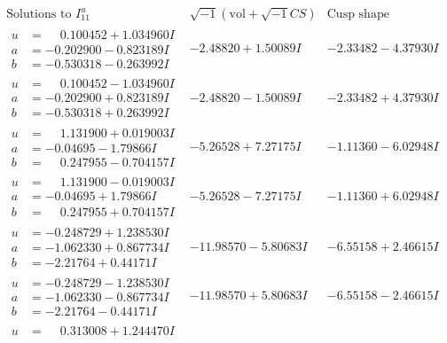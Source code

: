 \documentclass[1p]{elsarticle_modified}
\theoremstyle{definition}
\newcommand{\I}{\sqrt{-1}}
\begin{document}
$$\begin{array}{c|c|c}  
\text{Solutions to }I^u_{11}& \I (\text{vol} + \sqrt{-1}CS) & \text{Cusp shape}\\
 \hline 
\begin{aligned}
u &= \phantom{-}0.100452 + 1.034960 I \\
a &= -0.202900 - 0.823189 I \\
b &= -0.530318 - 0.263992 I\end{aligned}
 & -2.48820 + 1.50089 I & -2.33482 - 4.37930 I \\ \hline\begin{aligned}
u &= \phantom{-}0.100452 - 1.034960 I \\
a &= -0.202900 + 0.823189 I \\
b &= -0.530318 + 0.263992 I\end{aligned}
 & -2.48820 - 1.50089 I & -2.33482 + 4.37930 I \\ \hline\begin{aligned}
u &= \phantom{-}1.131900 + 0.019003 I \\
a &= -0.04695 - 1.79866 I \\
b &= \phantom{-}0.247955 - 0.704157 I\end{aligned}
 & -5.26528 + 7.27175 I & -1.11360 - 6.02948 I \\ \hline\begin{aligned}
u &= \phantom{-}1.131900 - 0.019003 I \\
a &= -0.04695 + 1.79866 I \\
b &= \phantom{-}0.247955 + 0.704157 I\end{aligned}
 & -5.26528 - 7.27175 I & -1.11360 + 6.02948 I \\ \hline\begin{aligned}
u &= -0.248729 + 1.238530 I \\
a &= -1.062330 + 0.867734 I \\
b &= -2.21764 + 0.44171 I\end{aligned}
 & -11.98570 - 5.80683 I & -6.55158 + 2.46615 I \\ \hline\begin{aligned}
u &= -0.248729 - 1.238530 I \\
a &= -1.062330 - 0.867734 I \\
b &= -2.21764 - 0.44171 I\end{aligned}
 & -11.98570 + 5.80683 I & -6.55158 - 2.46615 I \\ \hline\begin{aligned}
u &= \phantom{-}0.313008 + 1.244470 I \\

\end{aligned}
\end{array}$$
\end{document}
